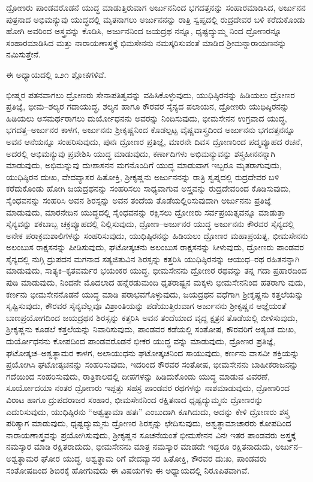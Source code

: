 ದ್ರೋಣರು ಪಾಂಡವರೊಡನೆ ಯುದ್ಧ ಮಾಡುತ್ತಿರುವಾಗ ಅರ್ಜುನನಿಂದ ಭಗದತ್ತನನ್ನು ಸಂಹಾರಮಾಡಿಸಿದ, ಅರ್ಜುನನ ಪುತ್ರನಾದ ಅಭಿಮನ್ಯುವು ಯುದ್ಧದಲ್ಲಿ ಮೃತನಾಗಲು ಅರ್ಜುನನನ್ನು ರಾತ್ರಿ ಸ್ವಪ್ನದಲ್ಲಿ ರುದ್ರದೇವರ ಬಳಿ ಕರೆದುಕೊಂಡು ಹೋಗಿ ಅವರಿಂದ ಅಸ್ತ್ರವನ್ನು ಕೊಡಿಸಿ, ಅರ್ಜುನನಿಂದ ಜಯದ್ರಥ ನನ್ನೂ, ಧೃಷ್ಟದ್ಯುಮ್ಮ ನಿಂದ ದ್ರೋಣರನ್ನೂ ಸಂಹಾರಮಾಡಿಸಿದ ಮತ್ತು ನಾರಾಯಣಾಸ್ತ್ರಕ್ಕೆ ಭಿಮಸೇನನು ನಮಸ್ಕರಿಸುವಂತೆ ಮಾಡಿದ ಶ‍್ರೀಮನ್ನಾರಾಯಣನನ್ನು ನಮಿಸುತ್ತೇನೆ.

ಈ ಅಧ್ಯಾಯದಲ್ಲಿ ೩೨೧ ಶ್ಲೋಕಗಳಿವೆ.

ಭೀಷ್ಮರ ಪತನವಾಗಲು ದ್ರೋಣರು ಸೇನಾಪತಿತ್ವವನ್ನು ವಹಿಸಿಕೊಳ್ಳುವುದು, ಯುಧಿಷ್ಠಿರನನ್ನು ಹಿಡಿಯಲು ದ್ರೋಣರ ಪ್ರತಿಜ್ಞೆ, ಭೀಮ–ಶಲ್ಯರ ಗದಾಯುದ್ಧ, ಶಲ್ಯನ ಹಾಗೂ ಕೌರವರ ಸೈನ್ಯದ ಪಲಾಯನ, ದ್ರೋಣರು ಯುಧಿಷ್ಠಿರನನ್ನು ಹಿಡಿಯಲು ಅಸಮರ್ಥರಾಗಲು ದುರ್ಯೋಧನನು ಅವರನ್ನು ನಿಂದಿಸುವುದು, ಭೀಮಸೇನನ ಉಗ್ರವಾದ ಯುದ್ಧ, ಭಗದತ್ತ–ಅರ್ಜುನರ ಕಾಳಗ, ಅರ್ಜುನನು ಶ‍್ರೀಕೃಷ್ಣನಿಂದ ಕೊಡಲ್ಪಟ್ಟ ವೈಷ್ಣವಾಸ್ತ್ರದಿಂದ ಅರ್ಜುನನು ಭಗದತ್ತನನ್ನೂ ಅವನ ಆನೆಯನ್ನೂ ಸಂಹರಿಸುವುದು, ಪುನಃ ದ್ರೋಣರ ಪ್ರತಿಜ್ಞೆ, ಮಾರನೇ ದಿವಸ ದ್ರೋಣರಿಂದ ಪದ್ಮವ್ಯೂಹದ ರಚನೆ, ಅದರಲ್ಲಿ ಅಭಿಮನ್ಯುವು ಪ್ರವೇಶಿಸಿ ಯುದ್ಧ ಮಾಡುವುದು, ಕರ್ಣಾದಿಗಳು ಅಭಿಮನ್ಯುವನ್ನು ಶಸ್ತ್ರಹೀನನನ್ನಾಗಿ ಮಾಡುವುದು, ಅಭಿಮನ್ನುವು ದುಃಶಾಸನನ ಮಗನೊಂದಿಗೆ ಯುದ್ಧ ಮಾಡುವಾಗ ಇಬ್ಬರೂ ಮೃತರಾಗುವುದು, ಯುಧಿಷ್ಠಿರನ ದುಃಖ, ವೇದವ್ಯಾಸರ ಹಿತೋಕ್ತಿ, ಶ‍್ರೀಕೃಷ್ಣನು ಅರ್ಜುನನನ್ನು ರಾತ್ರಿ ಸ್ವಪ್ನದಲ್ಲಿ ರುದ್ರದೇವರ ಬಳಿ ಕರೆದುಕೊಂಡು ಹೋಗಿ ಜಯದ್ರಥನನ್ನು ಸಂಹರಿಸಲು ಸಾಧ್ಯವಾಗುವ ಅಸ್ತ್ರವನ್ನು ರುದ್ರದೇವರಿಂದ ಕೊಡಿಸುವುದು, ಸೈಂಧವನನ್ನು ಸಂಹರಿಸಿ ಅವನ ಶಿರಸ್ಸನ್ನು ಅವನ ತಂದೆಯ ತೊಡೆಯಲ್ಲಿರಿಸುವುದಾಗಿ ಅರ್ಜುನನು ಪ್ರತಿಜ್ಞೆ ಮಾಡುವುದು, ಮಾರನೇದಿನ ಯುದ್ಧದಲ್ಲಿ ಸೈಂಧವನನ್ನು ರಕ್ಷಿಸಲು ದ್ರೋಣರು ಸರ್ವಪ್ರಯತ್ನವನ್ನೂ ಮಾಡುತ್ತಾ ಸೈನ್ಯವನ್ನು ಶಕಬಾಬ್ಬ ಚಕ್ರವ್ಯೂಹದಲ್ಲಿ ನಿಲ್ಲಿಸುವುದು, ದ್ರೋಣ–ಅರ್ಜುನರ ಯುದ್ಧ ಅರ್ಜುನನು ಕೌರವರ ಸೈನ್ಯದಲ್ಲಿ ಅನೇಕ ಪರಾಕ್ರಮಶಾಲಿಗಳನ್ನು ಸಂಹರಿಸುವುದು, ಯುಧಿಷ್ಠಿರನನ್ನು ಹಿಡಿಯಲು ದ್ರೋಣರ ಮಹಾಪ್ರಯತ್ನ, ಭೀಮಸೇನನು ಅಲಂಬುಸ ರಾಕ್ಷಸನನ್ನು ಪೀಡಿಸುವುದು, ಘಟೋತ್ಕಚನು ಅಲಂಬುಸ ರಾಕ್ಷಸನನ್ನು ಸೀಳುವುದು, ದ್ರೋಣರು ಪಾಂಡವರ ಸೈನ್ಯದಲ್ಲಿ ನುಗ್ಗಿ ದ್ರುಪದನ ಮಗನಾದ ಸತ್ಯಜಿತುವಿನ ಶಿರಸ್ಸನ್ನು ಕತ್ತರಿಸಿ ಯುಧಿಷ್ಠಿರನನ್ನು ಆಯುಧ–ರಥ ರಹಿತನನ್ನಾಗಿ ಮಾಡುವುದು, ಸಾತ್ಯಕಿ–ಕೃತವರ್ಮರ ಭಯಂಕರ ಯುದ್ಧ, ಭೀಮಸೇನನು ದ್ರೋಣರ ರಥವನ್ನು ತನ್ನ ಗದಾ ಪ್ರಹಾರದಿಂದ ಪುಡಿ ಮಾಡುವುದು, ನಿಂದನೇ ಮೊದಲಾದ ಹನ್ನೆರಡುಮಂದಿ ಧೃತರಾಷ್ಟ್ರನ ಮಕ್ಕಳು ಭೀಮಸೇನನಿಂದ ಹತರಾಗು ವುದು, ಕರ್ಣನು ಭೀಮಸೇನನೊಡನೆ ಯುದ್ಧ ಮಾಡಿ ಪರಾಭವಗೊಳ್ಳುವುದು, ಜಯದ್ರಥನ ವಧೆಗಾಗಿ ಶ‍್ರೀಕೃಷ್ಣನು ಕತ್ತಲೆಯನ್ನು ಸೃಷ್ಟಿಸುವುದು, ಕೌರವರ ಸೈನ್ಯವೆಲ್ಲವೂ ವಿಶ್ರಾಂತಿಯನ್ನು ಪಡೆಯುತ್ತಿರುವಾಗ ಅರ್ಜುನನು ಶ‍್ರೀಕೃಷ್ಣನ ಆಜ್ಞೆಯಂತೆ ಬಾಣಪ್ರಯೋಗದಿಂದ ಜಯದ್ರಥನ ಶಿರಸ್ಸನ್ನು ಕತ್ತರಿಸಿ ಅವನ ತಂದೆಯಾದ ವೃದ್ದ ಕ್ಷತ್ರನ ತೊಡೆಯಲ್ಲಿ ಬೀಳಿಸುವುದು, ಶ‍್ರೀಕೃಷ್ಣನು ಕೂಡಲೆ ಕತ್ತಲೆಯನ್ನು ನಿವಾರಿಸುವುದು, ಪಾಂಡವರ ಕಡೆಯಲ್ಲಿ ಸಂತೋಷ, ಕೌರವರಿಗೆ ಅತ್ಯಂತ ದುಃಖ, ದುರ್ಯೋಧನನು ಕೋಪದಿಂದ ಪಾಂಡವರೊಡನೆ ಭೀಕರ ಯುದ್ಧ ವನ್ನು ಮಾಡುವುದು, ದ್ರೋಣರ ಪ್ರತಿಜ್ಞೆ, ಘಟೋತ್ಕಚ–ಅಶ್ವತ್ಥಾಮರ ಕಾಳಗ, ಅಲಾಯುಧನು ಘಟೋತ್ಕಚನಿಂದ ಸಾಯುವುದು, ಕರ್ಣನು ವಾಸವೀ ಶಕ್ತಿಯನ್ನು ಪ್ರಯೋಗಿಸಿ ಘಟೋತ್ಕಚನನ್ನು ಸಂಹರಿಸುವುದು, ಇದರಿಂದ ಕೌರವರ ಸಂತೋಷ, ಭೀಮಸೇನನು ಬಾಹೀಕರಾಜನನ್ನು ಗದೆಯಿಂದ ಸಂಹರಿಸುವುದು, ರಾತ್ರಿಕಾಲದಲ್ಲಿ ದೀಪಗಳನ್ನು ಹಿಡಿದುಕೊಂಡು ಯುದ್ಧ ಮಾಡುವ ವಿವರಣೆ, ಸೂರ್ಯೋದಯಾ ನಂತರ ದ್ರೋಣರು ಇಪ್ಪತ್ತು ಸಹಸ್ರ ಪಾಂಡವರ ರಥಗಳನ್ನು ನಾಶಮಾಡುವುದು, ದ್ರೋಣರಿಂದ ವಿರಾಟ ಹಾಗೂ ದ್ರುಪದರಾಜರ ಸಂಹಾರ, ಭೀಮಸೇನನಿಂದ ರಕ್ಷಿತನಾದ ಧೃಷ್ಟದ್ಯುಮ್ಮನು ದ್ರೋಣರನ್ನು ಎದುರಿಸುವುದು, ಯುಧಿಷ್ಠಿರನು “ಅಶ್ವತ್ಥಾಮಾ ಹತಃ” ಎಂಬುದಾಗಿ ಕೂಗಿದುದು, ಅದನ್ನು ಕೇಳಿ ದ್ರೋಣರು ಶಸ್ತ್ರ ಪರಿತ್ಯಾಗ ಮಾಡುವುದು, ಧೃಷ್ಟದ್ಯುಮ್ಮನು ದ್ರೋಣರ ಶಿರಸ್ಸನ್ನು ಛೇದಿಸುವುದು, ಅಶ್ವತ್ಥಾಮಾಚಾರರು ಕೋಪದಿಂದ ನಾರಾಯಣಾಸ್ತ್ರವನ್ನು ಪ್ರಯೋಗಿಸುವುದು, ಶ‍್ರೀಕೃಷ್ಣನ ಸೂಚನೆಯಂತೆ ಭೀಮಸೇನನ ವಿನಃ ಇತರ ಪಾಂಡವರು ಅಸ್ತ್ರಕ್ಕೆ ನಮಸ್ಕಾರ ಮಾಡಿ ರಕ್ಷಿತರಾದುದು, ಭೀಮಸೇನನು ಮಾತ್ರ ನಮಸ್ಕಾರ ಮಾಡದೇ ಇದ್ದರೂ ರಕ್ಷಿತನಾದುದು, ಅರ್ಜುನ–ಅಶ್ವತ್ಥಾಮರ ಘೋರ ಯುದ್ಧ, ಅಶ್ವತ್ಥಾಮ ರಿಗೆ ವೇದವ್ಯಾಸರ ಹಿತೋಕ್ತಿ, ಕೌರವರ ದುಃಖ, ಪಾಂಡವರು ಸಂತೋಷದಿಂದ ಶಿಬಿರಕ್ಕೆ ಹೋಗುವುದು ಈ ವಿಷಯಗಳು ಈ ಅಧ್ಯಾಯದಲ್ಲಿ ನಿರೂಪಿತವಾಗಿವೆ.



